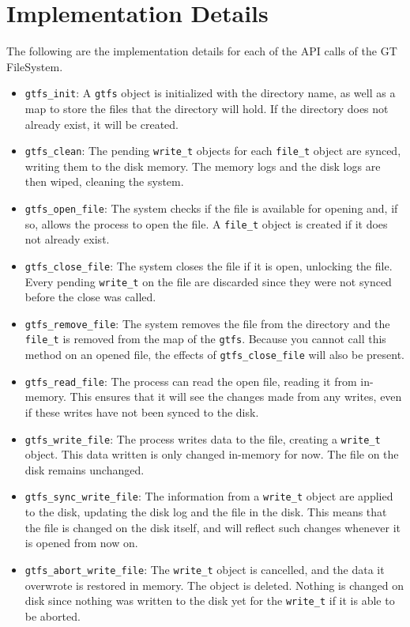 \documentclass{article}
\begin{document}
\section*{Implementation Details}
The following are the implementation details for each of the API calls of the GT FileSystem.
\begin{itemize}
    \item \texttt{gtfs\_init}: A \texttt{gtfs} object is initialized with the directory name, as well as a map to store the files that the directory will hold. If the directory does not already exist, it will be created.
    \item \texttt{gtfs\_clean}: The pending \texttt{write\_t} objects for each \texttt{file\_t} object are synced, writing them to the disk memory. The memory logs and the disk logs are then wiped, cleaning the system.
    \item \texttt{gtfs\_open\_file}: The system checks if the file is available for opening and, if so, allows the process to open the file. A \texttt{file\_t} object is created if it does not already exist. 
    \item \texttt{gtfs\_close\_file}: The system closes the file if it is open, unlocking the file. Every pending \texttt{write\_t} on the file are discarded since they were not synced before the close was called.
    \item \texttt{gtfs\_remove\_file}: The system removes the file from the directory and the \texttt{file\_t} is removed from the map of the \texttt{gtfs}. Because you cannot call this method on an opened file, the effects of \texttt{gtfs\_close\_file} will also be present.
    \item \texttt{gtfs\_read\_file}: The process can read the open file, reading it from in-memory. This ensures that it will see the changes made from any writes, even if these writes have not been synced to the disk.
    \item \texttt{gtfs\_write\_file}: The process writes data to the file, creating a \texttt{write\_t} object. This data written is only changed in-memory for now. The file on the disk remains unchanged. 
    \item \texttt{gtfs\_sync\_write\_file}: The information from a \texttt{write\_t} object are applied to the disk, updating the disk log and the file in the disk. This means that the file is changed on the disk itself, and will reflect such changes whenever it is opened from now on. 
    \item \texttt{gtfs\_abort\_write\_file}: The \texttt{write\_t} object is cancelled, and the data it overwrote is restored in memory. The object is deleted. Nothing is changed on disk since nothing was written to the disk yet for the \texttt{write\_t} if it is able to be aborted.
\end{itemize}
\end{document}
